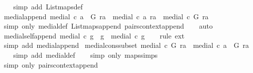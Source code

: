\begin{isabellebody}
%
\isadelimproof
\ \ %
\endisadelimproof
%
\isatagproof
{}\isamarkupfalse%
\ {\isacharparenleft}simp\ add{\isacharcolon}\ List{\isachardot}maps{\isacharunderscore}def{\isacharparenright}%
\endisatagproof
{\isafoldproof}%
%
\isadelimproof
\isanewline
%
\endisadelimproof
\isanewline
{}\isamarkupfalse%
\ medial{\isacharunderscore}append{\isacharcolon}\ {\isachardoublequoteopen}medial\ c\ {\isacharparenleft}a\ {\isacharat}\ G{\isacharparenright}\ ra\ {\isacharequal}\ medial\ c\ a\ ra\ {\isacharbar}{\isasymunion}{\isacharbar}\ medial\ c\ G\ ra{\isachardoublequoteclose}\isanewline
%
\isadelimproof
\ \ %
\endisadelimproof
%
\isatagproof
{}\isamarkupfalse%
\ {\isacharparenleft}simp\ only{\isacharcolon}\ medial{\isacharunderscore}def\ List{\isacharunderscore}maps{\isacharunderscore}append\ pairs{}context{\isacharunderscore}append{\isacharparenright}\isanewline
\ \ \isamarkupfalse%
\ auto%
\endisatagproof
{\isafoldproof}%
%
\isadelimproof
\isanewline
%
\endisadelimproof
\isanewline
{}\isamarkupfalse%
\ medial{\isacharunderscore}self{\isacharunderscore}append{\isacharcolon}\ {\isachardoublequoteopen}medial\ c\ {\isacharparenleft}g\ {\isacharat}\ g{\isacharparenright}\ {\isacharequal}\ medial\ c\ g{\isachardoublequoteclose}\isanewline
%
\isadelimproof
\ \ %
\endisadelimproof
%
\isatagproof
{}\isamarkupfalse%
\ {\isacharparenleft}rule\ ext{\isacharparenright}\isanewline
\ \ \isamarkupfalse%
\ {\isacharparenleft}simp\ add{\isacharcolon}\ medial{\isacharunderscore}append{\isacharparenright}%
\endisatagproof
{\isafoldproof}%
%
\isadelimproof
\isanewline
%
\endisadelimproof
\isanewline
{}\isamarkupfalse%
\ medial{\isacharunderscore}cons{\isacharunderscore}subset{\isacharcolon}\ {\isachardoublequoteopen}medial\ c\ G\ ra\ {\isacharbar}{\isasymsubseteq}{\isacharbar}\ medial\ c\ {\isacharparenleft}a\ {\isacharhash}\ G{\isacharparenright}\ ra{\isachardoublequoteclose}\isanewline
%
\isadelimproof
\ \ %
\endisadelimproof
%
\isatagproof
{}\isamarkupfalse%
\ {\isacharparenleft}simp\ add{\isacharcolon}\ medial{\isacharunderscore}def{\isacharparenright}\isanewline
\ \ \isamarkupfalse%
\ {\isacharparenleft}simp\ only{\isacharcolon}\ maps{\isacharunderscore}simps{\isacharparenleft}{}{\isacharparenright}{\isacharparenright}\isanewline
\ \ \isamarkupfalse%
\ {\isacharparenleft}simp\ only{\isacharcolon}\ pairs{}context{\isacharunderscore}append{\isacharparenright}\isanewline
\ \ \isamarkupfalse%

\end{isabellebody}
